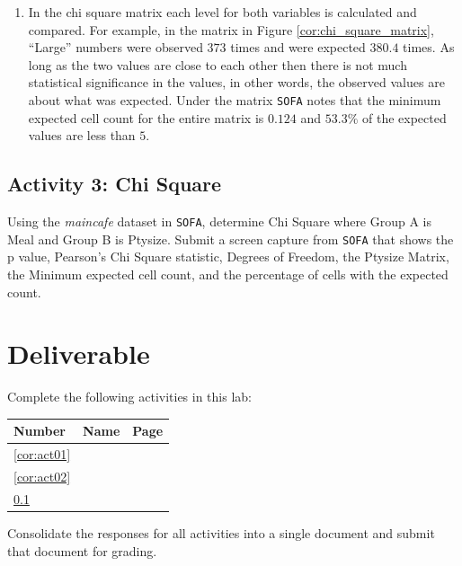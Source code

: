 \begin{enumerate}
  \item In the chi square matrix each level for both variables is calculated and compared. For example, in the matrix in Figure \ref{cor:chi_square_matrix}, ``Large'' numbers were observed $ 373 $ times and were expected $ 380.4 $ times. As long as the two values are close to each other then there is not much statistical significance in the values, in other words, the observed values are about what was expected. Under the matrix \texttt{SOFA} notes that the minimum expected cell count for the entire matrix is $ 0.124 $ and $ 53.3\% $ of the expected values are less than $ 5 $.

\end{enumerate}

\subsection{Activity 3: Chi Square} \label{cor:act03}

Using the \textit{maincafe} dataset in \texttt{SOFA}, determine Chi Square where Group A is Meal and Group B is Ptysize. Submit a screen capture from \texttt{SOFA} that shows the p value, Pearson's Chi Square statistic, Degrees of Freedom, the Ptysize Matrix, the Minimum expected cell count, and the percentage of cells with the expected count.

\section{Deliverable}

Complete the following activities in this lab:

\begin{center}
  \begin{tabular}{lll}
    \hline 
    \textbf{Number} & \textbf{Name} & \textbf{Page} \\ 
    \hline 
    \ref{cor:act01} & \nameref{cor:act01} & \pageref{cor:act01} \\ 
    \ref{cor:act02} & \nameref{cor:act02} & \pageref{cor:act02} \\ 
    \ref{cor:act03} & \nameref{cor:act03} & \pageref{cor:act03} \\ 
    \hline 
  \end{tabular} 
\end{center}

Consolidate the responses for all activities into a single document and submit that document for grading.

